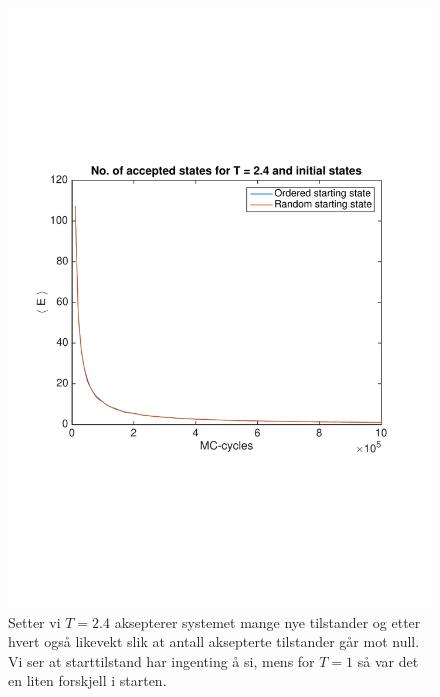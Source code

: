 \documentclass[norsk, 10pt]{article}
\begin{document}
\begin{figure}[H]
	\centering
	\includegraphics[scale = 0.6, trim = 1cm 8cm 1cm 8cm]{AccStatesL20T24.pdf}
	\caption{Setter vi $T=2.4$ aksepterer systemet mange nye tilstander og etter hvert også likevekt slik at antall aksepterte tilstander går mot null. Vi ser at starttilstand har ingenting å si, mens for $T=1$ så var det en liten forskjell i starten.}
	\label{fig:AccStatesL20T24}
\end{figure}
\end{document}

